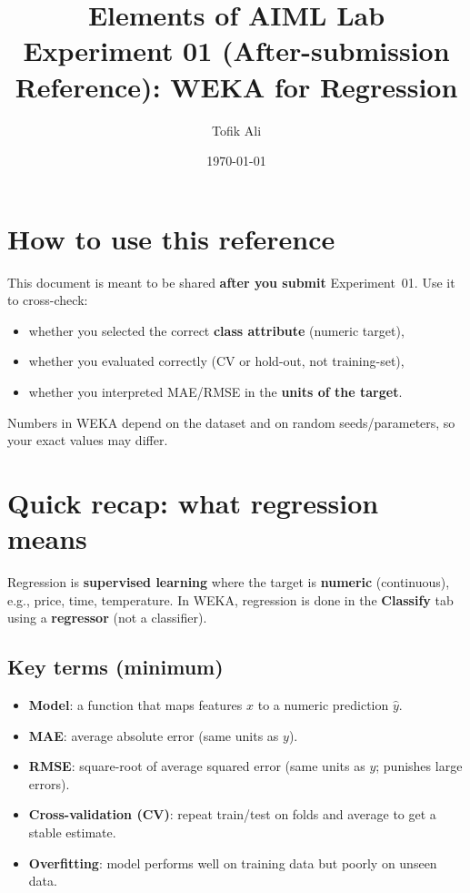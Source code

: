 \documentclass[11pt]{article}
\title{Elements of AIML Lab\\Experiment 01 (After-submission Reference): WEKA for Regression}
\author{Tofik Ali}
\date{\today}
\begin{document}
\maketitle
\tableofcontents

\section{How to use this reference}
This document is meant to be shared \textbf{after you submit} Experiment~01.
Use it to cross-check:
\begin{itemize}[leftmargin=*]
  \item whether you selected the correct \textbf{class attribute} (numeric target),
  \item whether you evaluated correctly (CV or hold-out, not training-set),
  \item whether you interpreted MAE/RMSE in the \textbf{units of the target}.
\end{itemize}
Numbers in WEKA depend on the dataset and on random seeds/parameters, so your exact values may differ.

\section{Quick recap: what regression means}
Regression is \textbf{supervised learning} where the target is \textbf{numeric} (continuous), e.g., price, time, temperature.
In WEKA, regression is done in the \textbf{Classify} tab using a \textbf{regressor} (not a classifier).

\subsection{Key terms (minimum)}
\begin{itemize}[leftmargin=*]
  \item \textbf{Model}: a function that maps features $x$ to a numeric prediction $\hat{y}$.
  \item \textbf{MAE}: average absolute error (same units as $y$).
  \item \textbf{RMSE}: square-root of average squared error (same units as $y$; punishes large errors).
  \item \textbf{Cross-validation (CV)}: repeat train/test on folds and average to get a stable estimate.
  \item \textbf{Overfitting}: model performs well on training data but poorly on unseen data.
\end{itemize}
\end{document}
